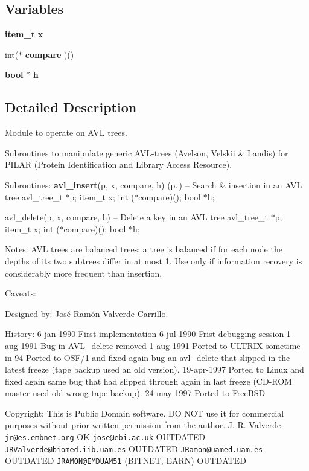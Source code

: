 \subsection*{Variables}
\begin{CompactItemize}
\item 
{\bf item\_\-t} {\bf x}
\item 
int($\ast$ {\bf compare} )()
\item 
{\bf bool} $\ast$ {\bf h}
\end{CompactItemize}


\subsection{Detailed Description}
Module to operate on AVL trees.

 

 Subroutines to manipulate generic AVL-trees (Avelson, Velskii \& Landis) for PILAR (Protein Identification and Library Access Resource).

Subroutines: {\bf avl\_\-insert}(p, x, compare, h) {\rm (p.\,\pageref{P__AVL_8c_a7})} -- Search \& insertion in an AVL tree avl\_\-tree\_\-t $\ast$p; item\_\-t x; int ($\ast$compare)(); bool $\ast$h;

avl\_\-delete(p, x, compare, h) -- Delete a key in an AVL tree avl\_\-tree\_\-t $\ast$p; item\_\-t x; int ($\ast$compare)(); bool $\ast$h;

Notes: AVL trees are balanced trees: a tree is balanced if for each node the depths of its two subtrees differ in at most 1. Use only if information recovery is considerably more frequent than insertion.

Caveats:

Designed by: Jos\'{e} Ram\'{o}n Valverde Carrillo.

History: 6-jan-1990 First implementation 6-jul-1990 Frist debugging session 1-aug-1991 Bug in AVL\_\-delete removed 1-aug-1991 Ported to ULTRIX sometime in 94 Ported to OSF/1 and fixed again bug an avl\_\-delete  that slipped in the latest freeze (tape backup used an  old version). 19-apr-1997 Ported to Linux and fixed again same bug that had slipped through again in last freeze (CD-ROM master used old wrong tape backup). 24-may-1997 Ported to Free\-BSD

Copyright: This is Public Domain software. DO NOT use it for commercial purposes without prior written permission from the author. J. R. Valverde {\tt jr@es.embnet.org} OK {\tt jose@ebi.ac.uk} OUTDATED {\tt JRValverde@biomed.iib.uam.es} OUTDATED {\tt JRamon@uamed.uam.es} OUTDATED {\tt JRAMON@EMDUAM51} (BITNET, EARN) OUTDATED

